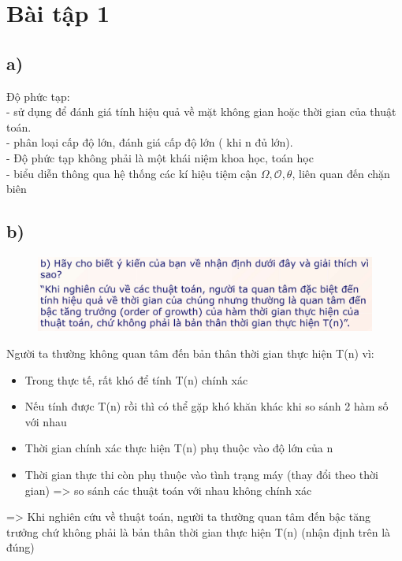 \documentclass[10pt,a4paper]{article}
\begin{document}
\section*{Bài tập 1} 
\subsection*{a)}
Độ phức tạp: \\
- sử dụng để đánh giá tính hiệu quả về mặt không gian hoặc thời gian của thuật toán.\\
- phân loại cấp độ lớn, đánh giá cấp độ lớn ( khi n đủ lớn).\\
- Độ phức tạp không phải là một khái niệm khoa học, toán học\\
- biểu diễn thông qua hệ thống các kí hiệu tiệm cận $\Omega, \mathcal{O}, \theta$, liên quan đến chặn biên
\subsection*{b)}
\begin{figure}[H]
        \centering
        \includegraphics[scale=0.75]{images/1b.png}
\end{figure}
Người ta thường không quan tâm đến bản thân thời gian thực hiện T(n) vì:
\begin{itemize}
    \item Trong thực tế, rất khó để tính T(n) chính xác
    \item Nếu tính được T(n) rồi thì có thể gặp khó khăn khác khi so sánh 2 hàm số với nhau
    \item Thời gian chính xác thực hiện T(n) phụ thuộc vào độ lớn của n
    \item Thời gian thực thi còn phụ thuộc vào tình trạng máy (thay đổi theo thời gian) => so sánh các thuật toán với nhau không chính xác
\end{itemize}
=> Khi nghiên cứu về thuật toán, người ta thường quan tâm đến bậc tăng trưởng chứ không phải là bản thân thời gian thực hiện T(n) (nhận định trên là đúng) 
\end{document}
